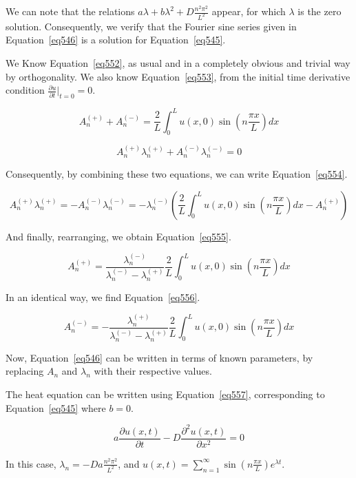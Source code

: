 We can note that the relations $a\lambda + b \lambda^2 + D\frac{n^2\pi^2}{L^2}$ appear, for which $\lambda$ is the zero solution. Consequently, we verify that the Fourier sine series given in Equation~\ref{eq546} is a solution for Equation~\ref{eq545}.

We Know Equation~\ref{eq552}, as usual and in a completely obvious and trivial way by orthogonality. We also know Equation~\ref{eq553}, from the initial time derivative condition $\frac{\partial u}{\partial t}\bigg\rvert_{t=0} = 0$.


\begin{equation}\label{eq552}
A_n^{(+)} + A_n^{(-)} = \frac{2}{L} \int_0^L u(x,0) \sin \left( n\frac{\pi x}{L} \right) dx
\end{equation}

\begin{equation}\label{eq553}
A_n^{(+)}\lambda_n^{(+)} + A_n^{(-)}\lambda_n^{(-)} = 0
\end{equation}


Consequently, by combining these two equations, we can write Equation~\ref{eq554}.


\begin{equation}\label{eq554}
A_n^{(+)}\lambda_n^{(+)} = - A_n^{(-)}\lambda_n^{(-)} = - \lambda_n^{(-)} \left( \frac{2}{L} \int_0^L u(x,0) \sin \left( n\frac{\pi x}{L} \right) dx - A_n^{(+)} \right)
\end{equation}

And finally, rearranging, we obtain Equation~\ref{eq555}.


\begin{equation}\label{eq555}
A_n^{(+)} = \frac{\lambda_n^{(-)}}{\lambda_n^{(-)} - \lambda_n^{(+)}} \frac{2}{L} \int_0^L u(x,0) \sin \left( n\frac{\pi x}{L} \right) dx
\end{equation}

In an identical way, we find Equation~\ref{eq556}.

\begin{equation}\label{eq556}
A_n^{(-)} = - \frac{\lambda_n^{(+)}}{\lambda_n^{(-)} - \lambda_n^{(+)}} \frac{2}{L} \int_0^L u(x,0) \sin \left( n\frac{\pi x}{L} \right) dx
\end{equation}

Now, Equation~\ref{eq546} can be written in terms of known parameters, by replacing $A_n$ and $\lambda_n$ with their respective values.


The heat equation can be written using Equation~\ref{eq557}, corresponding to Equation~\ref{eq545} where $b=0$.


\begin{equation}\label{eq557}
a\frac{\partial u(x,t)}{\partial t} - D\frac{\partial^2 u(x,t)}{\partial x^2} = 0
\end{equation}

In this case, $\lambda_n = -Da\frac{n^2\pi^2}{L^2}$, and $u(x,t) = \sum_{n=1}^{\infty} \sin \left( n\frac{\pi x}{L} \right) e^{\lambda t}$.
